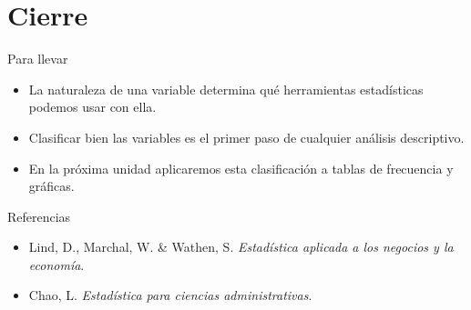 \documentclass[aspectratio=169,11pt]{beamer}
\begin{document}
\section{Cierre}

\begin{frame}{Para llevar}
  \begin{itemize}
    \item La naturaleza de una variable determina qué herramientas estadísticas podemos usar con ella.
    \item Clasificar bien las variables es el primer paso de cualquier análisis descriptivo.
    \item En la próxima unidad aplicaremos esta clasificación a tablas de frecuencia y gráficas.
  \end{itemize}
\end{frame}

\begin{frame}{Referencias}
  \begin{itemize}
    \item Lind, D., Marchal, W. \& Wathen, S. \emph{Estadística aplicada a los negocios y la economía}.
    \item Chao, L. \emph{Estadística para ciencias administrativas}.
  \end{itemize}
\end{frame}
\end{document}
